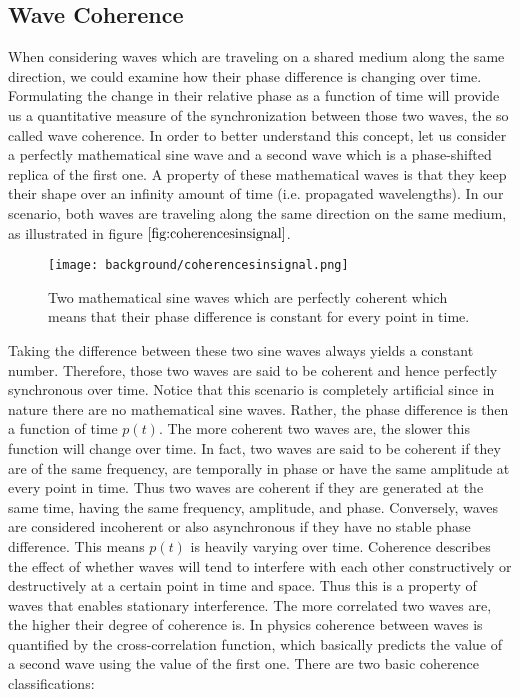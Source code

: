 \subsection{Wave Coherence}
\label{sec:wavecoherence}
When considering waves which are traveling on a shared medium along the same direction, we could examine how their phase difference is changing over time. Formulating the change in their relative phase as a function of time will provide us a quantitative measure of the synchronization between those two waves, the so called wave coherence. In order to better understand this concept, let us consider a perfectly mathematical sine wave and a second wave which is a phase-shifted replica of the first one. A property of these mathematical waves is that they keep their shape over an infinity amount of time (i.e. propagated wavelengths). In our scenario, both waves are traveling along the same direction on the same medium, as illustrated in figure $\ref{fig:coherencesinsignal}$.
\begin{figure}[H]
  \centering
  \texttt{[image: background/coherencesinsignal.png]}
  \caption[Wave Coherence]{Two mathematical sine waves which are perfectly coherent which means that their phase difference is constant for every point in time.}
  \label{fig:coherencesinsignal}
\end{figure}
\noindent
Taking the difference between these two sine waves always yields a constant number. Therefore, those two waves are said to be coherent and hence perfectly synchronous over time. Notice that this scenario is completely artificial since in nature there are no mathematical sine waves. Rather, the phase difference is then a function of time $p(t)$. The more coherent two waves are, the slower this function will change over time. 
In fact, two waves are said to be coherent if they are of the same frequency, are temporally in phase or have the same amplitude at every point in time. Thus two waves are coherent if they are generated at the same time, having the same frequency, amplitude, and phase. Conversely, waves are considered incoherent or also asynchronous if they have no stable phase difference. This means $p(t)$ is heavily varying over time. Coherence describes the effect of whether waves will tend to interfere with each other constructively or destructively at a certain point in time and space. Thus this is a property of waves that enables stationary interference. The more correlated two waves are, the higher their degree of coherence is. In physics coherence between waves is quantified by the cross-correlation function, which basically predicts the value of a second wave using the value of the first one. There are two basic coherence classifications:

